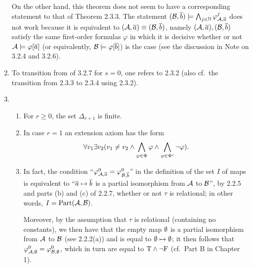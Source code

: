 \begin{enumerate}[1.]
On the other hand, this theorem does not seem to have a corresponding statement  to that of Theorem 2.3.3. The statement $(\mathcal{B}, \overline{b}) \models \bigwedge_{j \in \mathbb{N}} \varphi^{j}_{\mathcal{A}, \overline{a}}$ does not work because it is equivalent to $(\strct{A}, \vect{a}) \equv (\strct{B}, \vect{b})$, namely $(\mathcal{A}, \overline{a}), (\mathcal{B}, \overline{b})$ satisfy the same first-order formulas $\varphi$ in which it is decisive whether or not $\mathcal{A} \models \varphi[\overline{a}]$ (or equivalently, $\mathcal{B} \models \varphi[\overline{b}]$) is the case (see the discussion in Note on 3.2.4 and 3.2.6).
%
\item {} To transition from  of 3.2.7 for $s = 0$, one refers to 2.3.2 (also cf.\ the transition from 2.3.3 to 2.3.4 using 2.3.2).
%
\item {}
\begin{enumerate}[(1)]
\item For $r \geq 0$, the set $\Delta_{r + 1}$ is finite.
\item In case $r = 1$ an extension axiom has the form
\[
\forall v_1 \exists v_2 (v_1 \neq v_2 \land \bigwedge_{\varphi \in \Phi} \varphi \land \bigwedge_{\varphi \in \Phi^\mathit{c}} \neg\varphi).
\]
\item In fact, the condition ``$\varphi^{0}_{\mathcal{A}, \overline{a}} = \varphi^{0}_{\mathcal{B}, \overline{b}}$'' in the definition of the set $I$ of maps is equivalent to ``$\overline{a} \mapsto \overline{b}$ is a partial isomorphism from $\mathcal{A}$ to $\mathcal{B}$'', by 2.2.5 and parts (b) and (c) of 2.2.7, whether or not $\tau$ is relational; in other words, $I = \mathrm{Part}(\mathcal{A}, \mathcal{B})$.

Moreover, by the assumption that $\tau$ is relational (containing no constants), we then have that the empty map $\emptyset$ is a partial isomorphism from $\mathcal{A}$ to $\mathcal{B}$ (see 2.2.2(a)) and is equal to $\emptyset \mapsto \emptyset$; it then follows that $\varphi^{0}_{\mathcal{A}, \emptyset} = \varphi^{0}_{\mathcal{B}, \emptyset}$, which in turn are equal to $\mathrm{T} \land \neg\mathrm{F}$ (cf.\ Part B in Chapter 1).


\end{enumerate}
\end{enumerate}
